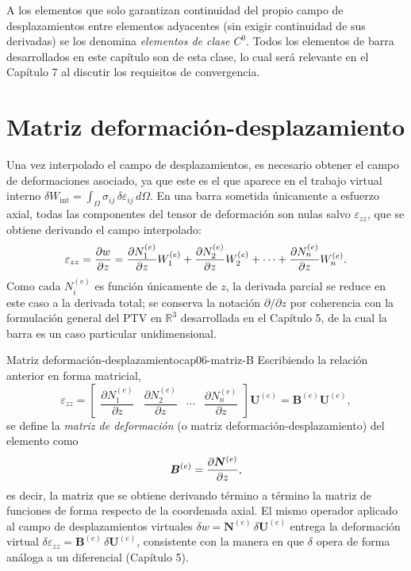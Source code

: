 A los elementos que solo garantizan continuidad del propio campo de desplazamientos entre elementos adyacentes (sin exigir continuidad de sus derivadas) se los denomina \emph{elementos de clase $C^0$}. Todos los elementos de barra desarrollados en este capítulo son de esta clase, lo cual será relevante en el Capítulo 7 al discutir los requisitos de convergencia.

\section{Matriz deformación-desplazamiento}

Una vez interpolado el campo de desplazamientos, es necesario obtener el campo de deformaciones asociado, ya que este es el que aparece en el trabajo virtual interno $\delta W_{\text{int}} = \int_\Omega \sigma_{ij}\,\delta \varepsilon_{ij}\, d\Omega$. En una barra sometida únicamente a esfuerzo axial, todas las componentes del tensor de deformación son nulas salvo $\varepsilon_{zz}$, que se obtiene derivando el campo interpolado:
\[
\varepsilon_{zz} = \pdv{w}{z} = \pdv{N_1^{(e)}}{z} W_1^{(e)} + \pdv{N_2^{(e)}}{z} W_2^{(e)} + \dots + \pdv{N_n^{(e)}}{z} W_n^{(e)} .
\]
Como cada $N_i^{(e)}$ es función únicamente de $z$, la derivada parcial se reduce en este caso a la derivada total; se conserva la notación $\partial/\partial z$ por coherencia con la formulación general del PTV en $\mathbb R^3$ desarrollada en el Capítulo 5, de la cual la barra es un caso particular unidimensional.

\begin{ecnimportante}{Matriz deformación-desplazamiento}{cap06-matriz-B}
Escribiendo la relación anterior en forma matricial,
\[
\varepsilon_{zz} = \begin{bmatrix} \dfrac{\partial N_1^{(e)}}{\partial z} & \dfrac{\partial N_2^{(e)}}{\partial z} & \cdots & \dfrac{\partial N_n^{(e)}}{\partial z} \end{bmatrix} \bm U^{(e)} = \bm B^{(e)} \bm U^{(e)},
\]
se define la \emph{matriz de deformación} (o matriz deformación-desplazamiento) del elemento como
\[
\bm B^{(e)} = \pdv{\bm N^{(e)}}{z} ,
\]
es decir, la matriz que se obtiene derivando término a término la matriz de funciones de forma respecto de la coordenada axial. El mismo operador aplicado al campo de desplazamientos virtuales $\delta w = \bm N^{(e)}\,\delta \bm U^{(e)}$ entrega la deformación virtual $\delta\varepsilon_{zz} = \bm B^{(e)}\, \delta \bm U^{(e)}$, consistente con la manera en que $\delta$ opera de forma análoga a un diferencial (Capítulo 5).
\end{ecnimportante}

